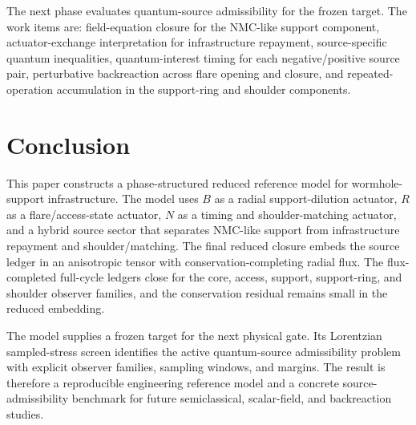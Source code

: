 \documentclass[11pt]{article}
\begin{document}
The next phase evaluates quantum-source admissibility for the frozen target.  The work items are: field-equation closure for the NMC-like support component, actuator-exchange interpretation for infrastructure repayment, source-specific quantum inequalities, quantum-interest timing for each negative/positive source pair, perturbative backreaction across flare opening and closure, and repeated-operation accumulation in the support-ring and shoulder components.

\section{Conclusion}

This paper constructs a phase-structured reduced reference model for wormhole-support infrastructure.  The model uses $B$ as a radial support-dilution actuator, $R$ as a flare/access-state actuator, $N$ as a timing and shoulder-matching actuator, and a hybrid source sector that separates NMC-like support from infrastructure repayment and shoulder/matching.  The final reduced closure embeds the source ledger in an anisotropic tensor with conservation-completing radial flux.  The flux-completed full-cycle ledgers close for the core, access, support, support-ring, and shoulder observer families, and the conservation residual remains small in the reduced embedding.

The model supplies a frozen target for the next physical gate.  Its Lorentzian sampled-stress screen identifies the active quantum-source admissibility problem with explicit observer families, sampling windows, and margins.  The result is therefore a reproducible engineering reference model and a concrete source-admissibility benchmark for future semiclassical, scalar-field, and backreaction studies.
\end{document}
